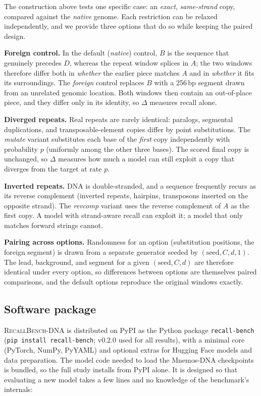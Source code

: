The construction above tests one specific case: an \emph{exact}, \emph{same-strand} copy,
compared against the \emph{native} genome. Each restriction can be relaxed independently, and
we provide three options that do so while keeping the paired design.

\textbf{Foreign control.} In the default (\emph{native}) control, $B$ is the sequence that
genuinely precedes $D$, whereas the repeat window splices in $A$; the two windows therefore
differ both in \emph{whether} the earlier piece matches $A$ and in \emph{whether} it fits its
surroundings. The \emph{foreign} control replaces $B$ with a 256\,bp segment drawn from an
unrelated genomic location. Both windows then contain an out-of-place piece, and they differ
only in its identity, so $\Delta$ measures recall alone.

\textbf{Diverged repeats.} Real repeats are rarely identical: paralogs, segmental duplications,
and transposable-element copies differ by point substitutions. The \emph{mutate} variant
substitutes each base of the \emph{first} copy independently with probability $p$ (uniformly
among the other three bases). The scored final copy is unchanged, so $\Delta$ measures how much
a model can still exploit a copy that diverges from the target at rate $p$.

\textbf{Inverted repeats.} DNA is double-stranded, and a sequence frequently recurs as its
reverse complement (inverted repeats, hairpins, transposons inserted on the opposite strand).
The \emph{revcomp} variant uses the reverse complement of $A$ as the first copy. A model with
strand-aware recall can exploit it; a model that only matches forward strings cannot.

\textbf{Pairing across options.} Randomness for an option (substitution positions, the foreign
segment) is drawn from a separate generator seeded by $(\text{seed}, C, d, 1)$. The lead,
background, and segment for a given $(\text{seed}, C, d)$ are therefore identical under every
option, so differences between options are themselves paired comparisons, and the default
options reproduce the original windows exactly.

\subsection{Software package}
\label{sec:impl}

\textsc{RecallBench-DNA} is distributed on PyPI as the Python package
\texttt{recall-bench} (\texttt{pip install recall-bench}; v0.2.0 used for all results), with a minimal core (PyTorch, NumPy, PyYAML) and optional extras for
Hugging Face models and data preparation. The model code needed to load the Mnemos-DNA
checkpoints is bundled, so the full study installs from PyPI alone. It is designed so that evaluating a new model takes
a few lines and no knowledge of the benchmark's internals:

